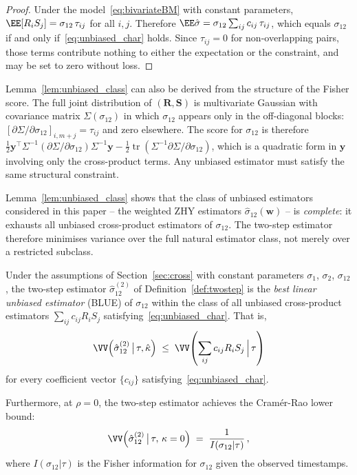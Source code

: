 \begin{proof}
Under the model~\eqref{eq:bivariateBM} with constant parameters,
$\EE[R_iS_j] = \sigma_{12}\,\tau_{ij}$ for all $i,j$.  Therefore
$\EE\hat\sigma = \sigma_{12}\sum_{ij}c_{ij}\,\tau_{ij}$, which
equals $\sigma_{12}$ if and only if~\eqref{eq:unbiased_char} holds.
Since $\tau_{ij}=0$ for non-overlapping pairs, those terms contribute
nothing to either the expectation or the constraint, and may be set
to zero without loss.
\end{proof}

\begin{remark}
Lemma~\ref{lem:unbiased_class} can also be derived from the
structure of the Fisher score.  The full joint distribution of
$(\mathbf{R},\mathbf{S})$ is multivariate Gaussian with covariance
matrix $\Sigma(\sigma_{12})$ in which $\sigma_{12}$ appears only
in the off-diagonal blocks: $[\partial\Sigma/\partial\sigma_{12}]_{i,m+j} = \tau_{ij}$
and zero elsewhere.  The score for $\sigma_{12}$ is therefore
$\frac{1}{2}\mathbf{y}^\top\Sigma^{-1}
(\partial\Sigma/\partial\sigma_{12})\Sigma^{-1}\mathbf{y}
- \frac{1}{2}\operatorname{tr}(\Sigma^{-1}\partial\Sigma/\partial\sigma_{12})$,
which is a quadratic form in $\mathbf{y}$ involving only the
cross-product terms.  Any unbiased estimator must satisfy the same
structural constraint.
\end{remark}

Lemma~\ref{lem:unbiased_class} shows that the class of unbiased
estimators considered in this paper -- the weighted ZHY estimators
$\hat\sigma_{12}(\mathbf{w})$ -- is \emph{complete}: it exhausts
all unbiased cross-product estimators of $\sigma_{12}$.
The two-step estimator therefore minimises variance over the full
natural estimator class, not merely over a restricted subclass.

\begin{thm}
\label{thm:gaussmarkov}
Under the assumptions of Section~\ref{sec:cross} with constant
parameters $\sigma_1$, $\sigma_2$, $\sigma_{12}$, the two-step
estimator $\hat\sigma_{12}^{(2)}$ of Definition~\ref{def:twostep}
is the \emph{best linear unbiased estimator} (BLUE) of $\sigma_{12}$
within the class of all unbiased cross-product estimators
$\sum_{ij}c_{ij}R_iS_j$ satisfying~\eqref{eq:unbiased_char}.
That is,
\begin{equation}\label{eq:gaussmarkov}
    \VV\!\left(\hat\sigma_{12}^{(2)}\,\big|\,\tau,\hat\kappa\right)
    \;\leq\;
    \VV\!\left(\sum_{ij}c_{ij}R_iS_j\,\Big|\,\tau\right)
\end{equation}
for every coefficient vector $\{c_{ij}\}$
satisfying~\eqref{eq:unbiased_char}.

Furthermore, at $\rho = 0$, the two-step estimator achieves the
Cram\'er-Rao lower bound:
\begin{equation}\label{eq:cramer_rao_zero}
    \VV\!\left(\hat\sigma_{12}^{(2)}\,\big|\,\tau,\,\kappa=0\right)
    \;=\; \frac{1}{I(\sigma_{12}|\tau)}\,,
\end{equation}
where $I(\sigma_{12}|\tau)$ is the Fisher information for
$\sigma_{12}$ given the observed timestamps.
\end{thm}

